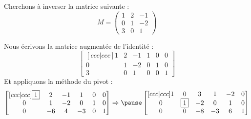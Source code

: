 \begin{frame}
  Cherchons à inverser la matrice suivante :
  \begin{equation*}
    M =
    \begin{pmatrix}
      1 & 2 & -1\\
      0 & 1 & -2\\
      3 & 0 & 1
    \end{pmatrix}
  \end{equation*}\pause{}

  Nous écrivons la matrice augmentée de l'identité :
  \begin{equation*}
    \begin{bmatrix}[ccc|ccc]
      1        & 2        & -1       & 1            & 0            & 0            \\
      0        & 1        & -2       & 0            & 1            & 0            \\
      3 & 0 & 1 & 0 & 0 & 1
    \end{bmatrix}
  \end{equation*}\pause{}
  Et appliquons la méthode du pivot :
  \begin{equation*}
    \begin{bmatrix}[ccc|ccc]
      \fbox{1} & 2        & -1       & 1            & 0            & 0            \\
      0        & 1        & -2       & 0            & 1            & 0            \\
      0 & -6 & 4 & -3 & 0 & 1
    \end{bmatrix}\Rightarrow\pause
    \begin{bmatrix}[ccc|ccc]
      1        & 0        & 3        & 1            & -2           & 0            \\
      0        & \fbox{1} & -2       & 0            & 1            & 0            \\
      0 & 0 & -8 & -3 & 6 & 1
    \end{bmatrix}
  \end{equation*}
\end{frame}
